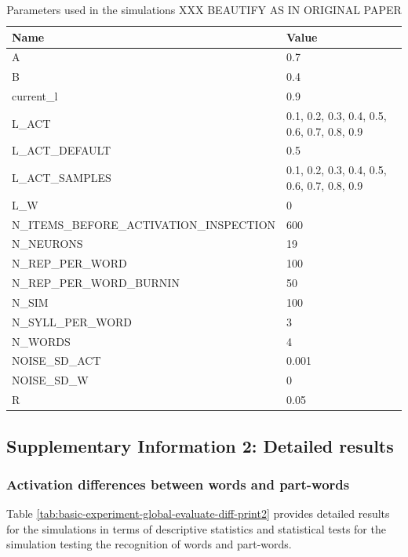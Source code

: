 \documentclass[
]{article}
\begin{document}
\begin{table}

\caption{\label{tab:list-parameters2}\label{tab:params}Parameters used in the simulations XXX BEAUTIFY AS IN ORIGINAL PAPER}
\centering
\begin{tabular}[t]{ll}
\toprule
Name & Value\\
\midrule
A & 0.7\\
B & 0.4\\
current\_l & 0.9\\
L\_ACT & 0.1, 0.2, 0.3, 0.4, 0.5, 0.6, 0.7, 0.8, 0.9\\
L\_ACT\_DEFAULT & 0.5\\
\addlinespace
L\_ACT\_SAMPLES & 0.1, 0.2, 0.3, 0.4, 0.5, 0.6, 0.7, 0.8, 0.9\\
L\_W & 0\\
N\_ITEMS\_BEFORE\_ACTIVATION\_INSPECTION & 600\\
N\_NEURONS & 19\\
N\_REP\_PER\_WORD & 100\\
\addlinespace
N\_REP\_PER\_WORD\_BURNIN & 50\\
N\_SIM & 100\\
N\_SYLL\_PER\_WORD & 3\\
N\_WORDS & 4\\
NOISE\_SD\_ACT & 0.001\\
\addlinespace
NOISE\_SD\_W & 0\\
R & 0.05\\
\bottomrule
\end{tabular}
\end{table}

\clearpage

\hypertarget{supplementary-information-2-detailed-results}{%
\subsection{Supplementary Information 2: Detailed
results}\label{supplementary-information-2-detailed-results}}

\hypertarget{activation-differences-between-words-and-part-words}{%
\subsubsection{Activation differences between words and
part-words}\label{activation-differences-between-words-and-part-words}}

Table \ref{tab:basic-experiment-global-evaluate-diff-print2} provides
detailed results for the simulations in terms of descriptive statistics
and statistical tests for the simulation testing the recognition of
words and part-words.
\end{document}
